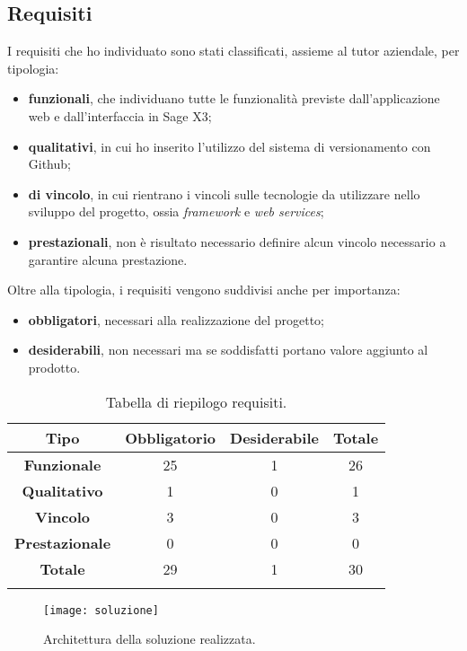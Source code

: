 \subsection{Requisiti}
I requisiti che ho individuato sono stati classificati, assieme al tutor aziendale, per tipologia:
\begin{itemize}
	\item \textbf{funzionali}, che individuano tutte le funzionalità previste dall'applicazione web e dall'interfaccia in Sage X3;
	\item \textbf{qualitativi}, in cui ho inserito l'utilizzo del sistema di versionamento con Github;
	\item \textbf{di vincolo}, in cui rientrano i vincoli sulle tecnologie da utilizzare nello sviluppo del progetto, ossia \textit{framework} e \textit{web services}; 
	\item \textbf{prestazionali}, non è risultato necessario definire alcun vincolo necessario a garantire alcuna prestazione.
\end{itemize}
Oltre alla tipologia, i requisiti vengono suddivisi anche per importanza:
\begin{itemize}
	\item \textbf{obbligatori}, necessari alla realizzazione del progetto;
	\item \textbf{desiderabili}, non necessari ma se soddisfatti portano valore aggiunto al prodotto.
\end{itemize}


\begin{center}
\begin{longtable}{ | c| c | c | c|}
	\hline
	\textbf{Tipo} & \textbf{Obbligatorio} & \textbf{Desiderabile} & \textbf{Totale}\\
	\hline
	\textbf{Funzionale} & 25 & 1 & 26 \\
	\hline
	\textbf{Qualitativo} & 1 & 0 & 1\\
	\hline
	\textbf{Vincolo} & 3 & 0 & 3 \\
	\hline
	\textbf{Prestazionale} & 0 & 0 & 0 \\
	\hline
	\textbf{Totale} & 29 & 1 & 30 \\
	\hline
	\caption{Tabella di riepilogo requisiti.}
\end{longtable}
\end{center}


\begin{figure}[htbp]
	\begin{center}
		\texttt{[image: soluzione]}
		\caption{Architettura della soluzione realizzata.}
	\end{center}
\end{figure}


